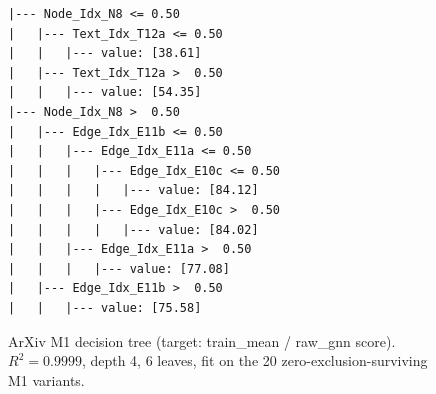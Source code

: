 \begin{figure}[htbp]
\centering
\begin{verbatim}
|--- Node_Idx_N8 <= 0.50
|   |--- Text_Idx_T12a <= 0.50
|   |   |--- value: [38.61]
|   |--- Text_Idx_T12a >  0.50
|   |   |--- value: [54.35]
|--- Node_Idx_N8 >  0.50
|   |--- Edge_Idx_E11b <= 0.50
|   |   |--- Edge_Idx_E11a <= 0.50
|   |   |   |--- Edge_Idx_E10c <= 0.50
|   |   |   |   |--- value: [84.12]
|   |   |   |--- Edge_Idx_E10c >  0.50
|   |   |   |   |--- value: [84.02]
|   |   |--- Edge_Idx_E11a >  0.50
|   |   |   |--- value: [77.08]
|   |--- Edge_Idx_E11b >  0.50
|   |   |--- value: [75.58]
\end{verbatim}
\caption{ArXiv M1 decision tree (target: train\_mean / raw\_gnn score). $R^2 = 0.9999$, depth 4, 6 leaves, fit on the 20 zero-exclusion-surviving M1 variants.}
\label{fig:arxiv-m1-tree}
\end{figure}
